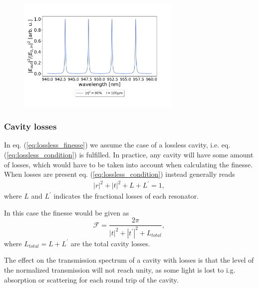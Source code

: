 \begin{figure}[h!]
    \centering
    \includegraphics[width=0.7\textwidth]{figures/airy_function_vs_wavelength.pdf}
    \caption{}
    \label{fig:airy_trans_vs_wavelength}
\end{figure}

\subsubsection{Cavity losses}

In eq. (\ref{eq:lossless_finesse}) we assume the case of a lossless cavity, i.e. eq. (\ref{eq:lossless_condition}) is fulfilled. In practice, any cavity will have some amount of losses, which would have to be taken into account when calculating the finesse. When losses are present eq. (\ref{eq:lossless_condition}) instead generally reads
\begin{eqnarray}
    |r|^2 + |t|^2 + L + L^{\prime} = 1,
\end{eqnarray}
where $L$ and $L^{\prime}$ indicates the fractional losses of each resonator.

In this case the finesse would be given as 
\begin{equation}
    \mathcal{F} = \frac{2 \pi}{|t|^2 + |t^{\prime}|^2 + L_{total}},
\end{equation}
where $L_{total} = L + L^{\prime}$ are the total cavity losses.

The effect on the transmission spectrum of a cavity with losses is that the level of the normalized transmission will not reach unity, as some light is lost to i.g. absorption or scattering for each round trip of the cavity.
